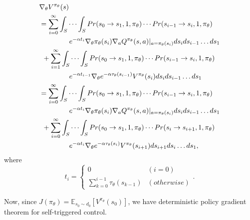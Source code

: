\documentclass[english, dvipdfmx]{ampmt}             %
\newcommand{\expect}{\mathbb{E}}
\begin{document}
\begin{align}
	&\nabla_{\theta}V^{\pi_{\theta}}(s) \nonumber \\
	&= \sum_{i=0}^{\infty}\int_{S}\cdots\int_{S}Pr(s_0\to s_1,1,\pi_{\theta})\cdots Pr(s_{i-1}\to s_i,1,\pi_{\theta})\nonumber\\
	&\hspace{10ex}e^{-\alpha t_i}\nabla_{\theta}\pi_{\theta}(s_i)\nabla_aQ^{\pi_{\theta}}(s,a)|_{a=\pi_{\theta}(s_i)}ds_ids_{i-1}\ldots ds_1\nonumber\\
	&\hspace{1ex}+\sum_{i=1}^{\infty}\int_{S}\cdots\int_{S}Pr(s_0\to s_1,1,\pi_{\theta})\cdots Pr(s_{i-1}\to s_i,1,\pi_{\theta})\nonumber\\
	&\hspace{10ex}e^{-\alpha t_{i-1}}\nabla_{\theta}e^{-\alpha\tau_{\theta}(s_{i-1})}V^{\pi_{\theta}}(s_{i})ds_ids_{i-1}\ldots ds_1\nonumber\\
	&= \sum_{i=0}^{\infty}\int_{S}\cdots\int_{S}Pr(s_0\to s_1,1,\pi_{\theta})\cdots Pr(s_{i-1}\to s_i,1,\pi_{\theta})\nonumber\\
	&\hspace{10ex}e^{-\alpha t_i}\nabla_{\theta}\pi_{\theta}(s_i)\nabla_aQ^{\pi_{\theta}}(s,a)|_{a=\pi_{\theta}(s_i)}ds_ids_{i-1}\ldots ds_1\nonumber\\
	&\hspace{1ex}+\sum_{i=0}^{\infty}\int_{S}\cdots\int_{S}Pr(s_0\to s_1,1,\pi_{\theta})\cdots Pr(s_{i}\to s_{i+1},1,\pi_{\theta})\nonumber\\
	&\hspace{10ex}e^{-\alpha t_{i}}\nabla_{\theta}e^{-\alpha\tau_{\theta}(s_{i})}V^{\pi_{\theta}}(s_{i+1})ds_{i+1}ds_{i}\ldots ds_1,
\end{align}
where 
\begin{equation}
	t_i = \begin{cases}
    		0 & (i=0) \\
    		\sum_{k=0}^{i-1}\tau_{\theta}(s_{k-1}) & (otherwise)
  		\end{cases}.
\end{equation}\par
Now, since $J(\pi_{\theta}) = \expect_{s_0\sim d_0}[V^{\pi_{\theta}}(s_0)]$, we have deterministic policy gradient theorem for self-triggered control.\newpage
\end{document}
